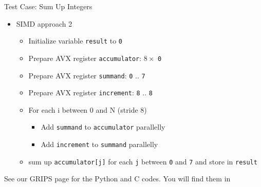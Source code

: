 
\begin{frame}{Test Case: Sum Up Integers}
%
\begin{itemize}
\item SIMD approach 2
	\begin{itemize}
	\item Initialize variable \texttt{result} to \texttt{0}
	\item Prepare AVX register \texttt{accumulator}: $8\times$ \texttt{0}
	\item Prepare AVX register \texttt{summand}: \texttt{0} .. \texttt{7}
	\item Prepare AVX register \texttt{increment}: \texttt{8} .. \texttt{8}
	\item For each i between 0 and N (stride 8)
		\begin{itemize}
		\item Add \texttt{summand} to \texttt{accumulator} parallelly
		\item Add \texttt{increment} to \texttt{summand} parallelly
		\end{itemize}
	\item sum up \texttt{accumulator[j]} for each \texttt{j} between \texttt{0} and \texttt{7} and store in \texttt{result}
	\end{itemize}
\end{itemize}
%
\begin{hintbox}
See our GRIPS page for the Python and C codes.
You will find them in 
\end{hintbox}
%
\end{frame}


